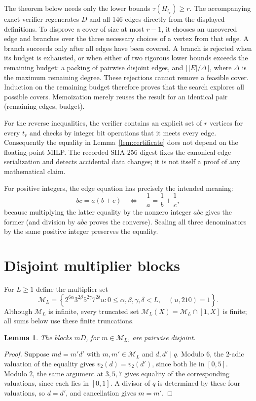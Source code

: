 \documentclass[11pt]{article}
\newtheorem{lemma}{Lemma}
\begin{document}
The theorem below needs only the lower bounds $\tau(H_{t_r})\geq r$.
The accompanying exact verifier regenerates $D$ and all 146 edges directly
from the displayed definitions.  To disprove a cover of size at most $r-1$,
it chooses an uncovered edge and branches over the three necessary choices
of a vertex from that edge.  A branch succeeds only after all edges have been
covered.  A branch is rejected when its budget is exhausted, or when either
of two rigorous lower bounds exceeds the remaining budget: a packing of
pairwise disjoint edges, and $\lceil |E|/\Delta\rceil$, where $\Delta$ is the
maximum remaining degree.  These rejections cannot remove a feasible cover.
Induction on the remaining budget therefore proves that the search explores
all possible covers.  Memoization merely reuses the result for an identical
pair (remaining edges, budget).

For the reverse inequalities, the verifier contains an explicit set of $r$
vertices for every $t_r$ and checks by integer bit operations that it meets
every edge.  Consequently the equality in Lemma~\ref{lem:certificate} does
not depend on the floating-point MILP.  The recorded SHA-256 digest fixes the
canonical edge serialization and detects accidental data changes; it is not
itself a proof of any mathematical claim.

For positive integers, the edge equation has precisely the intended meaning:
\[
 bc=a(b+c)
 \quad\Longleftrightarrow\quad
 \frac1a=\frac1b+\frac1c,
\]
because multiplying the latter equality by the nonzero integer $abc$ gives
the former (and division by $abc$ proves the converse).  Scaling all three
denominators by the same positive integer preserves the equality.

\section{Disjoint multiplier blocks}
For $L\geq1$ define the multiplier set
\[
 \mathcal M_L=\left\{
 2^{6\alpha}3^{2\beta}5^{2\gamma}7^{2\delta}u:
 0\leq\alpha,\beta,\gamma,\delta<L,\quad (u,210)=1
 \right\}.
\]
Although $\mathcal M_L$ is infinite, every truncated set
$\mathcal M_L(X)=\mathcal M_L\cap[1,X]$ is finite; all sums below use these
finite truncations.

\begin{lemma}\label{lem:disjoint}
The blocks $mD$, for $m\in\mathcal M_L$, are pairwise disjoint.
\end{lemma}
\begin{proof}
Suppose $md=m'd'$ with $m,m'\in\mathcal M_L$ and $d,d'\mid q$.
Modulo $6$, the $2$-adic valuation of the equality gives
$v_2(d)=v_2(d')$, since both lie in $[0,5]$.  Modulo $2$, the same argument
at $3,5,7$ gives equality of the corresponding valuations, since each lies
in $[0,1]$.  A divisor of $q$ is determined by these four valuations, so
$d=d'$, and cancellation gives $m=m'$.
\end{proof}
\end{document}
